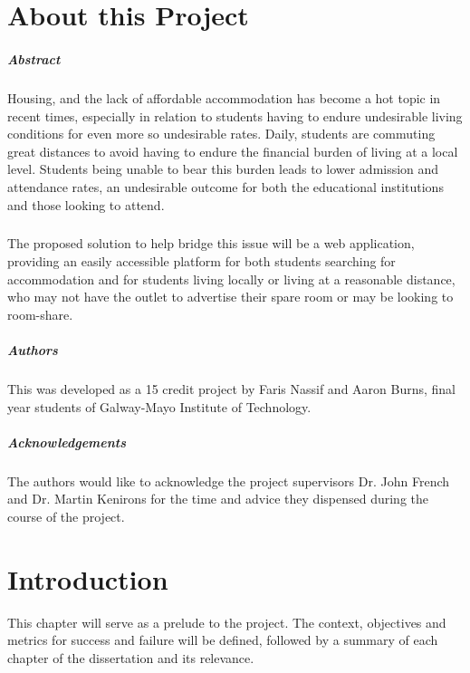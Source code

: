 \chapter*{About this Project}
\paragraph{Abstract}
Housing, and the lack of affordable accommodation has become a hot topic in recent times, especially in relation to students having to endure undesirable living conditions for even more so undesirable rates. Daily, students are commuting great distances to avoid having to endure the financial burden of living at a local level. Students being unable to bear this burden leads to lower admission and attendance rates, an undesirable outcome for both the educational institutions and those looking to attend.

\paragraph{}
The proposed solution to help bridge this issue will be a web application, providing an easily accessible platform for both students searching for accommodation and for students living locally or living at a reasonable distance, who may not have the outlet to advertise their spare room or may be looking to room-share. 

\paragraph{Authors}
This was developed as a 15 credit project by Faris Nassif and Aaron Burns, final year students of Galway-Mayo Institute of Technology.

\paragraph{Acknowledgements}
The authors would like to acknowledge the project supervisors Dr. John French and Dr. Martin Kenirons for the time and advice they dispensed during the course of the project.

\chapter{Introduction}
This chapter will serve as a prelude to the project. The context, objectives and metrics for success and failure will be defined, followed by a summary of each chapter of the dissertation and its relevance.

